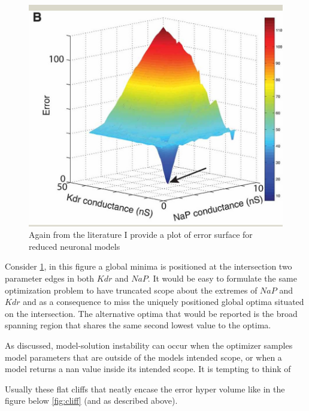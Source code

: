 \begin{figure}
    \centering
    \includegraphics[scale=0.65]{figures/fninf-01-001-g009.jpg}
    \caption[An optimal value that would be missed using only a slim parameter range]{
    Again from the literature I provide a plot of error surface for reduced neuronal models
    \citep{van2008automated}
    \citep{van2007neurofitter}}
    \label{fig:best_at_edge}
\end{figure}

Consider \ref{fig:best_at_edge}, in this figure a global minima is positioned at the intersection two parameter edges in both $Kdr$ and $NaP$. It would be easy to formulate the same optimization problem to have truncated scope about the extremes of $NaP$ and $Kdr$ and as a consequence to miss the uniquely positioned global optima situated on the intersection. The alternative optima that would be reported is the broad spanning region that shares the same second lowest value to the optima. 

As discussed, model-solution instability can occur when the optimizer samples model parameters that are outside of the models intended scope, or when a model returns a nan value inside its intended scope. It is tempting to think of 

Usually these flat cliffs that neatly encase the error hyper volume like in the figure below \ref{fig:cliff} (and as described above).


